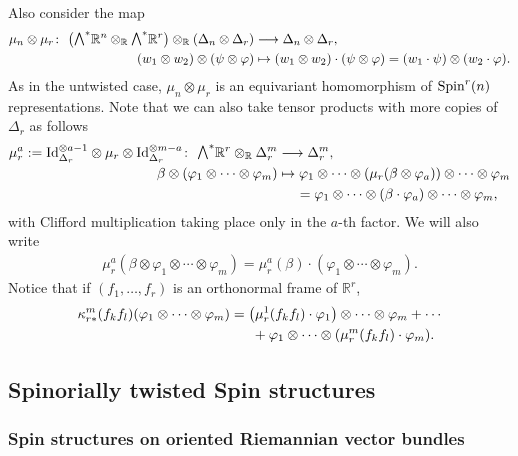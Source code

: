 \documentclass[pdftex]{sigma}
\newcommand{\ext}{\raise1pt\hbox{\small$\bigwedge$}}
\numberwithin{equation}{section}
\begin{document}
Also consider the map
\begin{align*}
 \mu_n\otimes\mu_r\colon \ \big(\ext^*\mathbb{R}^n\otimes_\mathbb{R} \ext^*\mathbb{R}^r\big) \otimes_\mathbb{R} (\Delta_n\otimes \Delta_r) &\longrightarrow \Delta_n\otimes\Delta_r,\\
(w_1 \otimes w_2)\otimes (\psi\otimes \varphi) &\mapsto (w_1\otimes w_2)\cdot (\psi\otimes \varphi)= (w_1\cdot\psi) \otimes (w_2\cdot \varphi).
\end{align*}
As in the untwisted case, $\mu_n\otimes\mu_r$ is an equivariant homomorphism of ${\rm Spin}^r(n)$ representations. Note that we can also take tensor products with more copies of $\Delta_r$ as follows
\begin{align*}
\mu_r^a:= {\rm Id}_{\Delta_r}^{\otimes a-1}\otimes \mu_r\otimes {\rm Id}_{\Delta_r}^{\otimes m-a}\colon \
\ext^*\mathbb{R}^r
 \otimes_\mathbb{R} \Delta_r^{m} &\longrightarrow \Delta_r^{m},\\
\beta\otimes ( \varphi_1\otimes\cdots\otimes \varphi_{m}) &\mapsto \varphi_1\otimes\cdots\otimes (\mu_r(\beta\otimes\varphi_a))\otimes\cdots\otimes\varphi_{m}\\
& \hphantom{\mapsto}{} \ = \varphi_1\otimes\cdots\otimes (\beta\cdot\varphi_a)\otimes\cdots\otimes \varphi_{m},
\end{align*}
with Clifford multiplication taking place only in the $a$-th factor. We will also write
\begin{gather*}
\mu_r^a(\beta\otimes \varphi_1\otimes\cdots\otimes \varphi_{m})
 = \mu_r^a(\beta)\cdot (\varphi_1\otimes\cdots\otimes \varphi_{m}) .
\end{gather*}
Notice that if $(f_1,\dots,f_r)$ is an orthonormal frame of $\mathbb{R}^r$,
\begin{gather}
\kappa_{r*}^m(f_kf_l) (\varphi_1\otimes\cdots \otimes\varphi_m)=
\big(\mu_r^1(f_kf_l)\cdot\varphi_1\big)\otimes\cdots \otimes\varphi_m +\cdots\nonumber\\
\hphantom{\kappa_{r*}^m(f_kf_l) (\varphi_1\otimes\cdots \otimes\varphi_m)=}{} + \varphi_1\otimes\cdots \otimes(\mu_r^m(f_kf_l)\cdot\varphi_m).\label{kappa-en-mus}
\end{gather}

\subsection{Spinorially twisted Spin structures}

\subsubsection{Spin structures on oriented Riemannian vector bundles}
\end{document}
